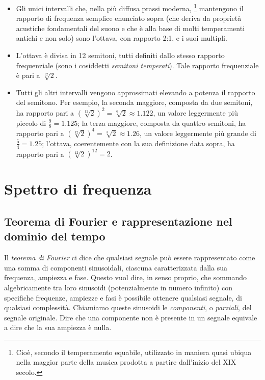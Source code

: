 \begin{itemize}

\item Gli unici intervalli che, nella più diffusa prassi moderna,%
\footnote {Cioè, secondo il temperamento equabile, utilizzato in maniera quasi ubiqua nella maggior parte della musica prodotta a partire dall'inizio del XIX secolo.}
mantengono il rapporto di frequenza semplice enunciato sopra (che deriva da proprietà acustiche fondamentali del suono e che è alla base di molti temperamenti antichi e non solo) sono l'ottava, con rapporto 2:1, e i suoi multipli.

\item L'ottava è divisa in 12 semitoni, tutti definiti dallo stesso rapporto frequenziale (sono i cosiddetti \emph{semitoni temperati}). Tale rapporto frequenziale è pari a $\sqrt[12]{2}$.

\item Tutti gli altri intervalli vengono approssimati elevando a potenza il rapporto del semitono. Per esempio, la seconda maggiore, composta da due semitoni, ha rapporto pari a $(\sqrt[12]{2})^2 = \sqrt[6]{2} \approx 1.122$, un valore leggermente più piccolo di $\frac{9}{8} = 1.125$; la terza maggiore, composta da quattro semitoni, ha rapporto pari a $(\sqrt[12]{2})^4 = \sqrt[3]{2} \approx 1.26$, un valore leggermente più grande di $\frac{5}{4} = 1.25$; l'ottava, coerentemente con la sua definizione data sopra, ha rapporto pari a $(\sqrt[12]{2})^{12} = 2$.

\end{itemize}




\section{Spettro di frequenza}

\subsection{Teorema di Fourier e rappresentazione nel dominio del tempo}

Il \emph{teorema di Fourier} ci dice che qualsiasi segnale può essere rappresentato come una somma di componenti sinusoidali, ciascuna caratterizzata dalla sua frequenza, ampiezza e fase. Questo vuol dire, in senso proprio, che sommando algebricamente tra loro sinusoidi (potenzialmente in numero infinito) con specifiche frequenze, ampiezze e fasi è possibile ottenere qualsiasi segnale, di qualsiasi complessità. Chiamiamo queste sinusoidi le \emph{componenti}, o \emph{parziali}, del segnale originale. Dire che una componente non è presente in un segnale equivale a dire che la sua ampiezza è nulla.

